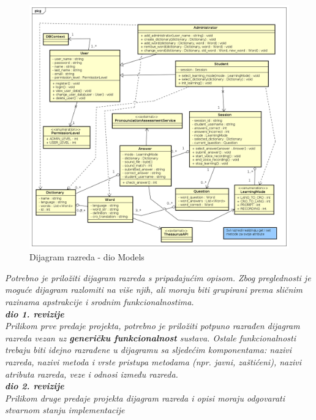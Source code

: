 			\begin{figure}[H]
				\includegraphics[width=\textwidth]{dijagrami/classmodel.png} %
				\caption{Dijagram razreda - dio Models}
				\label{fig:classmodel} %
			\end{figure}
		
			\textit{Potrebno je priložiti dijagram razreda s pripadajućim opisom. Zbog preglednosti je moguće dijagram razlomiti na više njih, ali moraju biti grupirani prema sličnim razinama apstrakcije i srodnim funkcionalnostima.}\\
			
			\textbf{\textit{dio 1. revizije}}\\
			
			\textit{Prilikom prve predaje projekta, potrebno je priložiti potpuno razrađen dijagram razreda vezan uz \textbf{generičku funkcionalnost} sustava. Ostale funkcionalnosti trebaju biti idejno razrađene u dijagramu sa sljedećim komponentama: nazivi razreda, nazivi metoda i vrste pristupa metodama (npr. javni, zaštićeni), nazivi atributa razreda, veze i odnosi između razreda.}\\
			
			\textbf{\textit{dio 2. revizije}}\\			
			
			\textit{Prilikom druge predaje projekta dijagram razreda i opisi moraju odgovarati stvarnom stanju implementacije}
			
